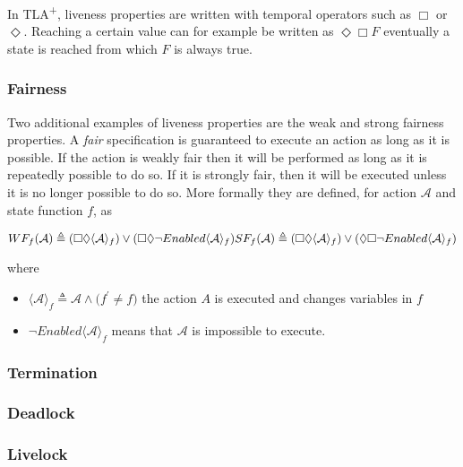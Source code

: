 \documentclass[english, biblatex, digitaloutput]{kththesis}
\begin{document}
In TLA\textsuperscript+, liveness properties are written with temporal operators such as $\Box$ or $\Diamond$. Reaching a certain value can for example be written as $\Diamond \Box F$ \ie eventually a state is reached from which $F$ is always true.

\subsubsection{Fairness}

Two additional examples of liveness properties are the weak and strong fairness properties. A \textit{fair} specification is guaranteed to execute an action as long as it is possible. If the action is weakly fair then it will be performed as long as it is repeatedly possible to do so. If it is strongly fair, then it will be executed unless it is no longer possible to do so. More formally they are defined, for action $\mathcal{A}$ and state function $f$, as

\begin{math}
	WF_f\lparen \mathcal{A} \rparen \triangleq \lparen \Box \Diamond \langle \mathcal{A} \rangle_f \rparen \lor  \lparen \Box \Diamond \neg Enabled \langle \mathcal{A} \rangle_f \rparen \\
	SF_f\lparen \mathcal{A} \rparen \triangleq \lparen \Box \Diamond \langle \mathcal{A} \rangle_f \rparen \lor  \lparen \Diamond \Box \neg Enabled \langle \mathcal{A} \rangle_f \rparen
\end{math}

where

\begin{itemize}
	\item $\langle \mathcal{A} \rangle_f \triangleq \mathcal{A} \land \lparen f^\prime \neq f \rparen $ \ie the action $A$ is executed and changes variables in $f$
	\item $\neg Enabled \langle \mathcal{A} \rangle_f$ means that $\mathcal{A}$ is impossible to execute.
\end{itemize}

\subsubsection{Termination}

\subsubsection{Deadlock}

\subsubsection{Livelock}
\end{document}
